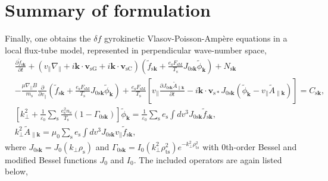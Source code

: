 \section{Summary of formulation}
\label{sec:Summary of formulation}
Finally, one obtains the $\delta f$ gyrokinetic Vlasov-Poisson-Amp\`{e}re equations in a local flux-tube model, represented in perpendicular wave-number space,
\begin{align}
  &\frac{\partial \tilde{f}_{\mathrm{s}\bm{k}}}{\partial t} + \left( v_\parallel \nabla_\parallel + i \bm{k} \cdot \bm{v}_\mathrm{sG} + i \bm{k} \cdot \bm{v}_\mathrm{sC} \right) \left( \tilde{f}_{\mathrm{s}\bm{k}} + \frac{e_\mathrm{s} F_\mathrm{sM}}{T_\mathrm{s}} J_{0\mathrm{s}\bm{k}} \tilde{\phi}_{\bm{k}} \right) + N_{\mathrm{s}\bm{k}} \nonumber \\
  &- \frac{\mu \nabla_\parallel B}{m_\mathrm{s}} \frac{\partial}{\partial v_\parallel} \left( \tilde{f}_{\mathrm{s}\bm{k}} + \frac{e_\mathrm{s} F_\mathrm{sM}}{T_\mathrm{s}} J_{0\mathrm{s}\bm{k}} \tilde{\phi}_{\bm{k}} \right) + \frac{e_\mathrm{s} F_\mathrm{sM}}{T_\mathrm{s}} \left[ v_\parallel \frac{\partial J_{0\mathrm{s}\bm{k}} \tilde{A}_{\parallel\bm{k}}}{\partial t} - i \bm{k} \cdot \bm{v}_{\mathrm{s}*} J_{0\mathrm{s}\bm{k}} (\tilde{\phi}_{\bm{k}} - v_\parallel \tilde{A}_{\parallel\bm{k}}) \right] = C_{\mathrm{s}\bm{k}}, 
  \label{eq:vlasovink}\\
  &\left[ k_\perp^2 + \frac{1}{\varepsilon_0} \sum_\mathrm{s} \frac{e_\mathrm{s}^2 n_\mathrm{s}}{T_\mathrm{s}} \left( 1 - \Gamma_{0\mathrm{s}\bm{k}} \right) \right] \tilde{\phi}_{\bm{k}} = \frac{1}{\varepsilon_0} \sum_\mathrm{s} e_\mathrm{s} \int dv^3 J_{0\mathrm{s}\bm{k}} \tilde{f}_{\mathrm{s}\bm{k}},
  \label{eq:poissonink} \\
  &k_\perp^2 \tilde{A}_{\parallel\bm{k}} = \mu_0 \sum_\mathrm{s} e_\mathrm{s} \int dv^3 J_{0\mathrm{s}\bm{k}} v_\parallel \tilde{f}_{\mathrm{s}\bm{k}},
  \label{eq:ampereink}
\end{align}
where $J_{0\mathrm{s}\bm{k}}=J_0(k_\perp \rho_{\mathrm{s}})$ and $\Gamma_{0\mathrm{s}\bm{k}}=I_0(k_\perp^2 \rho_{\mathrm{ts}}^2)e^{-k_\perp^2 \rho_{\mathrm{ts}}^2}$ with 0th-order Bessel and modified Bessel functions $J_0$ and $I_0$. The included operators are again listed below,

